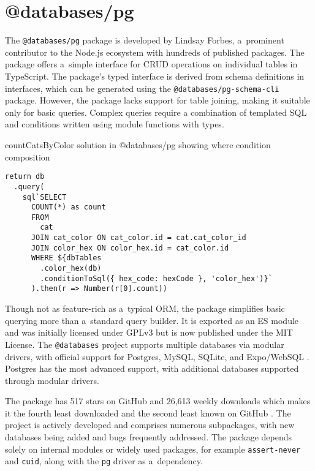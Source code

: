 \section{@databases/pg}
The \texttt{@databases/pg} package is developed by Lindsay Forbes, a~prominent
contributor to the Node.js ecosystem with hundreds of published packages. The
package offers a~simple interface for CRUD operations on individual tables in
TypeScript. The package's typed interface is derived from schema definitions in
interfaces, which can be generated using the \texttt{@databases/pg-schema-cli}
\cite{pg-schema-cli} package. However, the package lacks support for table
joining, making it suitable only for basic queries. Complex queries require a
combination of templated SQL and conditions written using module functions with
types.

\begin{listing}
    \caption{countCatsByColor solution in @databases/pg showing where condition composition}
    \label{lst:atdatabases/example}
    \begin{verbatim}
return db
  .query(
    sql`SELECT
      COUNT(*) as count
      FROM
        cat
      JOIN cat_color ON cat_color.id = cat.cat_color_id
      JOIN color_hex ON color_hex.id = cat_color.id
      WHERE ${dbTables
        .color_hex(db)
        .conditionToSql({ hex_code: hexCode }, 'color_hex')}`
      ).then(r => Number(r[0].count))
    \end{verbatim}
\end{listing}

Though not as feature-rich as a~typical ORM, the package simplifies basic
querying more than a~standard query builder. It is exported as an ES module and
was initially licensed under GPLv3 but is now published under the MIT License.
The \texttt{@databases} project supports multiple databases via modular drivers,
with official support for Postgres, MySQL, SQLite, and Expo/WebSQL
\cite{databases/pg}. Postgres has the most advanced support, with additional
databases supported through modular drivers.

The package has 517 stars on GitHub and 26,613 weekly downloads which makes it
the fourth least downloaded and the second least known on GitHub
\cite{databases/pg/npm}. The project is actively developed and comprises
numerous subpackages, with new databases being added and bugs frequently
addressed. The package depends solely on internal modules or widely used
packages, for example \texttt{assert-never} and \texttt{cuid}, along with the
\texttt{pg} driver as a~dependency.

